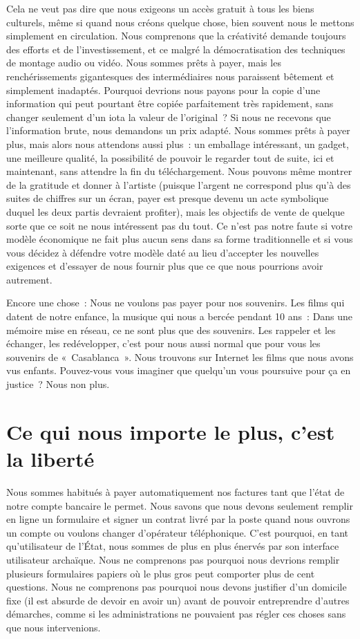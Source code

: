 Cela ne veut pas dire que nous exigeons un accès gratuit à tous les biens culturels, même si quand nous créons quelque chose, bien souvent nous le mettons simplement en circulation. Nous comprenons
que la créativité demande toujours des efforts et de l’investissement, et ce malgré la démocratisation des techniques de montage audio ou vidéo. Nous sommes prêts à payer, mais les renchérissements
gigantesques des intermédiaires nous paraissent bêtement et simplement inadaptés. Pourquoi devrions nous payons pour la copie d’une information qui peut pourtant être copiée parfaitement très
rapidement, sans changer seulement d’un iota la valeur de l’original~? Si nous ne recevons que l’information brute, nous demandons un prix adapté. Nous sommes prêts à payer plus, mais alors nous
attendons aussi plus~: un emballage intéressant, un gadget, une meilleure qualité, la possibilité de pouvoir le regarder tout de suite, ici et maintenant, sans attendre la fin du téléchargement. Nous
pouvons même montrer de la gratitude et donner à l’artiste (puisque l’argent ne correspond plus qu’à des suites de chiffres sur un écran, payer est presque devenu un acte symbolique duquel les deux
partis devraient profiter), mais les objectifs de vente de quelque sorte que ce soit ne nous intéressent pas du tout. Ce n’est pas notre faute si votre modèle économique ne fait plus aucun sens dans
sa forme traditionnelle et si vous vous décidez à défendre votre modèle daté au lieu d’accepter les nouvelles exigences et d’essayer de nous fournir plus que ce que nous pourrions avoir autrement.

Encore une chose~: Nous ne voulons pas payer pour nos souvenirs. Les films qui datent de notre enfance, la musique qui nous a bercée pendant 10 ans~: Dans une mémoire mise en réseau, ce ne sont plus
que des souvenirs. Les rappeler et les échanger, les redévelopper, c’est pour nous aussi normal que pour vous les souvenirs de «~Casablanca~». Nous trouvons sur Internet les films que nous avons vus
enfants. Pouvez-vous vous imaginer que quelqu’un vous poursuive pour ça en justice~? Nous non plus.

\section{Ce qui nous importe le plus, c’est la liberté}
Nous sommes habitués à payer automatiquement nos factures tant que l’état de notre compte bancaire le permet. Nous savons que nous devons seulement remplir en ligne un formulaire et signer un contrat
livré par la poste quand nous ouvrons un compte ou voulons changer d’opérateur téléphonique. C’est pourquoi, en tant qu’utilisateur de l’État, nous sommes de plus en plus énervés par son interface
utilisateur archaïque. Nous ne comprenons pas pourquoi nous devrions remplir plusieurs formulaires papiers où le plus gros peut comporter plus de cent questions. Nous ne comprenons pas pourquoi nous
devons justifier d’un domicile fixe (il est absurde de devoir en avoir un) avant de pouvoir entreprendre d’autres démarches, comme si les administrations ne pouvaient pas régler ces choses sans que
nous intervenions.

